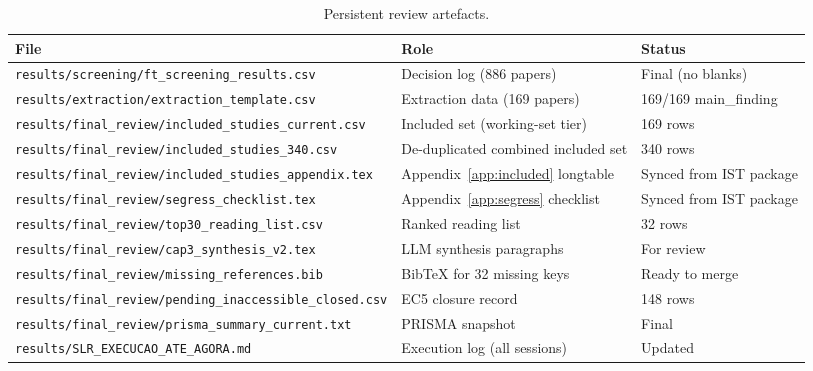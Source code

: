 \begin{table}[htbp]
\centering
\caption{Persistent review artefacts.}
\label{tab:app-artefacts}
\small
\setlength{\tabcolsep}{3pt}
\begin{tabular}{p{5.5cm} p{3.5cm} p{3.0cm}}
\toprule
\textbf{File} & \textbf{Role} & \textbf{Status} \\
\midrule
\texttt{results/screening/ft\_screening\_results.csv}
  & Decision log (886 papers) & Final (no blanks) \\
\texttt{results/extraction/extraction\_template.csv}
  & Extraction data (169 papers) & 169/169 main\_finding \\
\texttt{results/final\_review/included\_studies\_current.csv}
  & Included set (working-set tier) & 169 rows \\
\texttt{results/final\_review/included\_studies\_340.csv}
  & De-duplicated combined included set & 340 rows \\
\texttt{results/final\_review/included\_studies\_appendix.tex}
  & Appendix~\ref{app:included} longtable & Synced from IST package \\
\texttt{results/final\_review/segress\_checklist.tex}
  & Appendix~\ref{app:segress} checklist & Synced from IST package \\
\texttt{results/final\_review/top30\_reading\_list.csv}
  & Ranked reading list & 32 rows \\
\texttt{results/final\_review/cap3\_synthesis\_v2.tex}
  & LLM synthesis paragraphs & For review \\
\texttt{results/final\_review/missing\_references.bib}
  & BibTeX for 32 missing keys & Ready to merge \\
\texttt{results/final\_review/pending\_inaccessible\_closed.csv}
  & EC5 closure record & 148 rows \\
\texttt{results/final\_review/prisma\_summary\_current.txt}
  & PRISMA snapshot & Final \\
\texttt{results/SLR\_EXECUCAO\_ATE\_AGORA.md}
  & Execution log (all sessions) & Updated \\
\bottomrule
\end{tabular}
\end{table}



